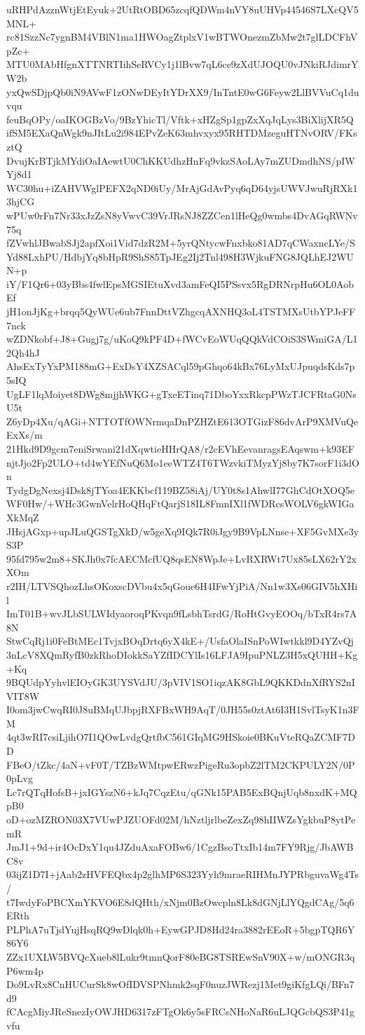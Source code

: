 uRHPdAzznWtjEtEyuk+2UtRtOBD65zcqfQDWm4nVY8uUHVp44546S7LXcQV5MNL+
rc81SzzNc7ygnBM4VBlN1ma1HWOagZtplxV1wBTWOnezmZbMw2t7glLDCFhVpZc+
MTU0MAbHfgnXTTNRTIihSeRVCy1j1lBvw7qL6ce9zXdUJOQU0vJNkiRJdimrYW2b
yxQwSDjpQb0iN9AVwF1zONwDEyItYDrXX9/InTntE0wG6Feyw2LlBVVuCq1duvqu
feuBqOPy/oaIKOGBzVo/9BzYhicTl/Vftk+xHZgSp1gpZxXqJqLys3BiXlijXR5Q
ifSM5EXaQnWgk9nJItLu2i984EPvZeK63mhvxyx95RHTDMzeguHTNvORV/FKsztQ
DvujKrBTjkMYdiOaIAewtU0ChKKUdhzHnFq9vkzSAoLAy7mZUDmdhNS/pIWYj8d1
WC30hu+iZAHVWglPEFX2qND0iUy/MrAjGdAvPyq6qD64yjsUWVJwuRjRXk13hjCG
wPUw0rFn7Nr33xJzZsN8yVwvC39VrJRsNJ8ZZCen1lHeQg0wmbs4DvAGqRWNv75q
fZVwhlJBwabSJj2apfXoi1Vid7dzR2M+5yrQNtycwFnxbko81AD7qCWaxncLYe/S
Yd88LxhPU/HdbjYq8bHpR9ShS85TpJEg2Ij2Tnl498H3WjkuFNG8JQLhEJ2WUN+p
iY/F1Qr6+03yBbs4fwlEpsMGSIEtuXvd3amFeQI5PSsvx5RgDRNrpHu6OL0AobEf
jH1onJjKg+brqq5QyWUe6ub7FnnDttVZhgcqAXNHQ3oL4TSTMXsUtbYPJeFF7nck
wZDNkobf+J8+Gugj7g/uKoQ9kPF4D+fWCvEoWUqQQkVdCOiS3SWmiGA/L12Qh4hJ
AhsExTyYxPM188mG+ExDsY4XZSACql59pGhqo64kBx76LyMxUJpuqdsKds7p5sIQ
UgLF1lqMoiyet8DWg8mjjhWKG+gTxeETinq71DboYxxRkcpPWzTJCFRtaG0NsU5t
Z6yDp4Xu/qAGi+NTTOTfOWNrmqaDnPZHZtE613OTGizF86dvArP9XMVuQeExXs/m
21Hkd9D9gcm7eniSrwani21dXqwtieHHrQA8/r2cEVhEevanragsEAqswm+k93EF
njtJjo2Fp2ULO+td4wYEfNuQ6Mo1eeWTZ4T6TWzvkiTMyzYj8by7K7sorF1i3dOn
TydgDgNexsj4Dsk8jTYoa4EKKbcf119BZ58iAj/UY0t8s1AhwlI77GhCdOtXOQ5e
WF0Hw/+WHc3GwnVelrHoQHqFtQarjS18IL8FmnIXl1fWDRcsWOLV6gkWIGaXkMqZ
JHsjAGxp+upJLuQGSTgXkD/w5geXq9IQk7R0iJgy9B9VpLNnse+XF5GvMXe3yS3P
95fd795w2m8+SKJh0x7fcAECMcfUQ8qsEN8WpJe+LvRXRWt7Ux85sLX62rY2xXOm
r2IH/LTVSQhozLhsOKoxscDVbu4x5qGoue6H4IFwYjPiA/Nn1w3Xs06GIV5hXHil
ImT01B+wvJLbSULWIdyaoroqPKvqn9fLsbhTsrdG/RoHtGvyEOOq/bTxR4rs7A8N
StwCqRj1i0FeBtMEc1TvjxBOqDrtq6yX4kE+/UsfaOlaISnPoWIwtkkl9D4YZvQj
3nLcV8XQmRyfB0zkRhoDIokkSaYZfIDCYlIs16LFJA9IpuPNLZ3H5xQUHH+Kg+Kq
9BQUdpYyhvlEIOyGK3UYSVdJU/3pVIV1SO1iqzAK8GbL9QKKDdnXfRYS2nIVIT8W
I0om3jwCwqRI0J8uBMqUJbpjRXFBxWH9AqT/0JH55s0ztAt6I3H1SvlTsyK1n3FM
4qt3wRI7csiLjihO7I1QOwLvdgQrtfbC561GIqMG9HSkoie0BKuVteRQaZCMF7DD
FBeO/tZkc/4aN+vF0T/TZBzWMtpwERwzPigeRu3opbZ2lTM2CKPULY2N/0P0pLvg
Lc7rQTqHofsB+jxIGYszN6+kJq7CqzEtu/qGNk15PAB5ExBQnjUqb8nxdK+MQpB0
oD+ozMZRON03X7VUwPJZUOFd02M/hNztljrlbeZexZq98hIIWZsYgkbuP8ytPemR
JmJ1+9d+ir4OcDxY1qu4JZduAxaFOBw6/1CgzBsoTtxIb14m7FY9Rjg/JbAWBC8v
03ijZ1D7I+jAab2zHVFEQbx4p2glhMP6S323Yyh9mraeRIHMnJYPRbguvaWg4Ts/
t7IwdyFoPBCXmYKVO6E8dQHth/xNjm0BzOwcpln8Lk8dGNjLlYQgdCAg/5q6ERth
PLPhA7uTjdYujHsqRQ9wDlqk0h+EywGPJD8Hd24ra3882rEEoR+5bgpTQR6Y86Y6
ZZx1UXLW5BVQcXueb8lLukr9tmnQorF80eBG8TSREwSnV90X+w/mONGR3qP6wm4p
Do9LvRx8CnHUCurSk8wOfIDVSPNhmk2sqF0nuzJWRezj1Met9giKfgLQi/BFn7d9
fCAcgMiyJReSnezIyOWJHD6317zFTgOk6y5sFRCsNHoNaR6uLJQGcbQS3P41gvfu
